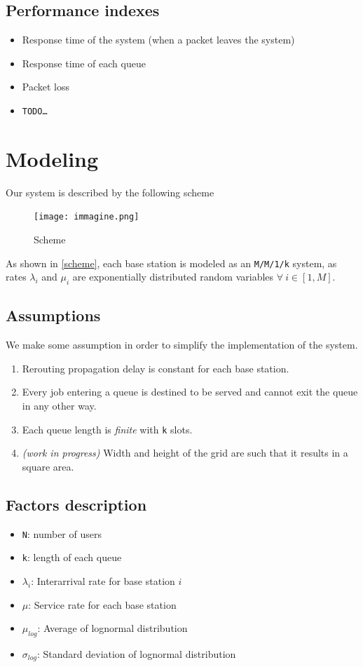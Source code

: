 \documentclass{article}
\begin{document}
\subsection{Performance indexes}
\begin{itemize}
    \item Response time of the system (when a packet leaves the system)
    \item Response time of each queue
    \item Packet loss
    \item \texttt{TODO\dots}
\end{itemize}

\section{Modeling}
Our system is described by the following scheme
\begin{figure}[H]
    \centering
    \texttt{[image: immagine.png]}
    \caption{Scheme}
    \label{scheme}
\end{figure}

As shown in \autoref{scheme}, each base station is modeled as an \texttt{M/M/1/k} system, as rates $\lambda_i$ and $\mu_i$ are exponentially distributed random variables $\forall \ i \in [1, M]$.

\subsection{Assumptions}
We make some assumption in order to simplify the implementation of the system.

\begin{enumerate}
    \item Rerouting propagation delay is constant for each base station.
    \item Every job entering a queue is destined to be served and cannot exit the queue in any other way.
    \item Each queue length is \textit{finite} with \texttt{k} slots.
    \item \textit{(work in progress)} Width and height of the grid are such that it results in a square area.
\end{enumerate}

\subsection{Factors description}\label{factors}
\begin{itemize}
    \item \texttt{N}: number of users
    \item \texttt{k}: length of each queue
    \item $\lambda_i$: Interarrival rate for base station $i$
    \item $\mu$: Service rate for each base station
    \item $\mu_{log}$: Average of lognormal distribution
    \item $\sigma_{log}$: Standard deviation of lognormal distribution
\end{itemize}
\end{document}
